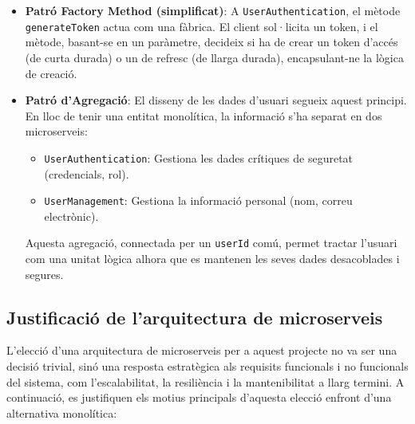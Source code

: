 \begin{itemize}
    \item \textbf{Patró Factory Method (simplificat)}: A \texttt{UserAuthentication}, el mètode \texttt{generateToken} actua com una fàbrica. El client sol·licita un token, i el mètode, basant-se en un paràmetre, decideix si ha de crear un token d'accés (de curta durada) o un de refresc (de llarga durada), encapsulant-ne la lògica de creació.

    \item \textbf{Patró d'Agregació}: El disseny de les dades d'usuari segueix aquest principi. En lloc de tenir una entitat monolítica, la informació s'ha separat en dos microserveis:
    \begin{itemize}
        \item \texttt{UserAuthentication}: Gestiona les dades crítiques de seguretat (credencials, rol).
        \item \texttt{UserManagement}: Gestiona la informació personal (nom, correu electrònic).
    \end{itemize}
    Aquesta agregació, connectada per un \texttt{userId} comú, permet tractar l'usuari com una unitat lògica alhora que es mantenen les seves dades desacoblades i segures.
\end{itemize}

\subsection{Justificació de l'arquitectura de microserveis}
L'elecció d'una arquitectura de microserveis per a aquest projecte no va ser una decisió trivial, sinó una resposta estratègica als requisits funcionals i no funcionals del sistema, com l'escalabilitat, la resiliència i la mantenibilitat a llarg termini. A continuació, es justifiquen els motius principals d'aquesta elecció enfront d'una alternativa monolítica:

